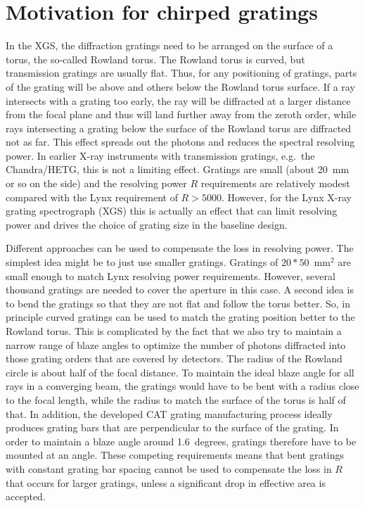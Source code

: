 \documentclass[]{spie}  %
\begin{document}
\section{Motivation for chirped gratings}
\label{sect:motivation}
In the XGS, the diffraction gratings need to be arranged on the surface of a torus, the so-called Rowland torus\cite{beuermann:78}. The Rowland torus is curved, but transmission gratings are usually flat. Thus, for any positioning of gratings, parts of the grating will be above and others below the Rowland torus surface. If a ray intersects with a grating too early, the ray will be diffracted at a larger distance from the focal plane and thus will land further away from the zeroth order, while rays intersecting a grating below the surface of the Rowland torus are diffracted not as far. This effect spreads out the photons and reduces the spectral resolving power. In earlier X-ray instruments with transmission gratings, e.g.\ the Chandra/HETG, this is not a limiting effect. Gratings are small (about 20~mm or so on the side) and the resolving power $R$ requirements are relatively modest compared with the Lynx requirement of $R> 5000$. However, for the Lynx X-ray grating spectrograph (XGS) this is actually an effect that can limit resolving power and drives the choice of grating size in the baseline design\cite{CATXGS}.

Different approaches can be used to compensate the loss in resolving power. The simplest idea might be to just use smaller gratings. Gratings of $20*50$~mm$^2$ are small enough to match Lynx resolving power requirements\cite{CATXGS}. However, several thousand gratings are needed to cover the aperture in this case. A second idea is to bend the gratings so that they are not flat and follow the torus better. So, in principle curved gratings can be used to match the grating position better to the Rowland torus. This is complicated by the fact that we also try to maintain a narrow range of blaze angles to optimize the number of photons diffracted into those grating orders that are covered by detectors. The radius of the Rowland circle is about half of the focal distance. To maintain the ideal blaze angle for all rays in a converging beam, the gratings would have to be bent with a radius close to the focal length, while the radius to match the surface of the torus is half of that.  In addition, the developed CAT grating manufacturing process ideally produces grating bars that are perpendicular to the surface of the grating. In order to maintain a blaze angle around 1.6~degrees, gratings therefore have to be mounted at an angle. These competing requirements means that bent gratings with constant grating bar spacing cannot be used to compensate the loss in $R$ that occurs for larger gratings, unless a significant drop in effective area is accepted.
\end{document}
